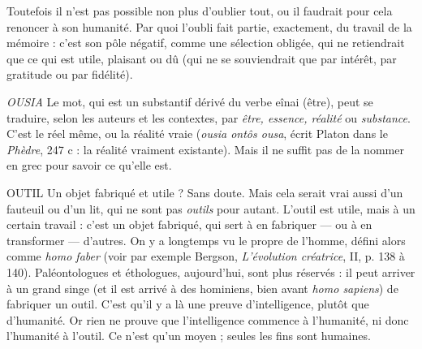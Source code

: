 Toutefois il n’est pas possible non plus d'oublier tout, ou il faudrait pour
cela renoncer à son humanité. Par quoi l’oubli fait partie, exactement, du travail
de la mémoire : c’est son pôle négatif, comme une sélection obligée, qui ne
retiendrait que ce qui est utile, plaisant ou dû (qui ne se souviendrait que par
intérêt, par gratitude ou par fidélité).

{\it OUSIA} Le mot, qui est un substantif dérivé du verbe eînai (être), peut se traduire,
selon les auteurs et les contextes, par {\it être, essence, réalité} ou
{\it substance}. C’est le réel même, ou la réalité vraie ({\it ousia ontôs ousa}, écrit Platon
dans le {\it Phèdre}, 247 c : la réalité vraiment existante). Mais il ne suffit pas de la
nommer en grec pour savoir ce qu’elle est.

OUTIL Un objet fabriqué et utile ? Sans doute. Mais cela serait vrai aussi
d’un fauteuil ou d’un lit, qui ne sont pas {\it outils} pour autant. L'outil
est utile, mais à un certain travail : c’est un objet fabriqué, qui sert à en fabriquer
— ou à en transformer — d’autres. On y a longtemps vu le propre de
l’homme, défini alors comme {\it homo faber} (voir par exemple Bergson, {\it L'évolution
créatrice}, II, p. 138 à 140). Paléontologues et éthologues, aujourd’hui, sont
plus réservés : il peut arriver à un grand singe (et il est arrivé à des hominiens,
bien avant {\it homo sapiens}) de fabriquer un outil. C’est qu’il y a là une preuve
d'intelligence, plutôt que d'humanité. Or rien ne prouve que l'intelligence
commence à l'humanité, ni donc l’humanité à l’outil. Ce n’est qu’un moyen ;
seules les fins sont humaines.
